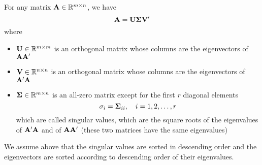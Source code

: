 \begin{definition}
	For any matrix ${\bf A}\in{\mathbb R}^{m\times n}$, we have
	\begin{equation}
		{\bf A}=\mathbf{U}\boldsymbol{\Sigma}\mathbf{V}^{\prime}
	\end{equation}
	where
	\begin{itemize}
		\item $\mathbf{U}\in{\mathbb R}^{m\times m}$ is an orthogonal matrix whose columns are the eigenvectors of ${\bf A}{\bf A}^{\prime}$
		\item $\mathbf{V}\in{\mathbb R}^{n\times n}$ is an orthogonal matrix whose columns are the eigenvectors of ${\bf A}^{\prime}{\bf A}$
		\item $\boldsymbol{\Sigma}\in{\mathbb R}^{m\times n}$ is an all-zero matrix except for the first $r$ diagonal elements
		      \begin{equation*}
			      \sigma_{i}=\boldsymbol{\Sigma}_{ii},\quad i=1,2,\ldots,r
		      \end{equation*}
		      which are called singular values, which are the square roots of the eigenvalues of ${\bf A}^{\prime}{\bf A}$ and of ${\bf A}{\bf A}^{\prime}$ (these two matrices have the same eigenvalues)
	\end{itemize}
\end{definition}

\begin{remark}
	We assume above that the singular values are sorted in descending order and the eigenvectors are sorted according to descending order of their eigenvalues.
\end{remark}

